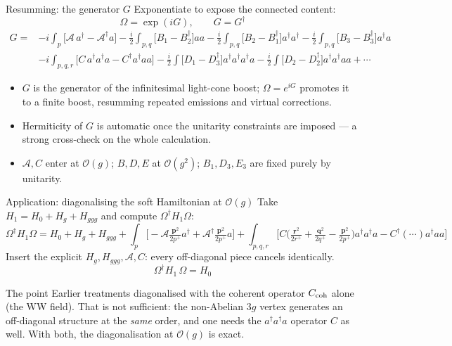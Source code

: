 \documentclass[9pt,aspectratio=169]{beamer}
\newcommand{\hl}[1]{\textcolor{acc}{#1}}
\newcommand{\hb}[1]{\textcolor{blu}{#1}}
\newcommand{\pp}{p^{+}}
\newcommand{\Om}{\Omega}
\newcommand{\Hg}{H_{g}}
\newcommand{\Hggg}{H_{ggg}}
\newcommand{\ad}{a^{\dagger}}
\begin{document}
\begin{frame}{Resumming: the generator $G$}
Exponentiate to expose the connected content:
\[
\boxed{\;\Om=\exp(iG),\qquad G=G^{\dagger}\;}
\]
\small
\begin{align*}
G=&-i\int_{p}\big[\mathcal{A}\,\ad-\mathcal{A}^{\dagger}a\big]
-\tfrac{i}{2}\!\int_{p,q}\big[B_{1}-B_{2}^{\dagger}\big]aa
-\tfrac{i}{2}\!\int_{p,q}\big[B_{2}-B_{1}^{\dagger}\big]\ad\ad
-\tfrac{i}{2}\!\int_{p,q}\big[B_{3}-B_{3}^{\dagger}\big]\ad a\\
&-i\!\int_{p,q,r}\big[C\,\ad\ad a-C^{\dagger}\ad a a\big]
-\tfrac{i}{2}\!\int\big[D_{1}-D_{3}^{\dagger}\big]\ad\ad\ad a
-\tfrac{i}{2}\!\int\big[D_{2}-D_{2}^{\dagger}\big]\ad\ad a a+\cdots
\end{align*}
\normalsize
\medskip
\begin{itemize}
  \item $G$ is the \hl{generator of the infinitesimal light-cone boost}; $\Om=e^{iG}$
        promotes it to a finite boost, resumming repeated emissions and virtual corrections.
  \item Hermiticity of $G$ is automatic once the unitarity constraints are imposed ---
        a strong \hb{cross-check} on the whole calculation.
  \item $\mathcal{A},C$ enter at $\mathcal{O}(g)$; $B,D,E$ at $\mathcal{O}(g^{2})$;
        $B_{1},D_{3},E_{3}$ are fixed purely by unitarity.
\end{itemize}
\end{frame}

\begin{frame}{Application: diagonalising the soft Hamiltonian at $\mathcal{O}(g)$}
Take $H_{1}=H_{0}+\Hg+\Hggg$ and compute $\Om^{\dagger}H_{1}\Om$:
\[
\Om^{\dagger}H_{1}\Om = H_{0}+\Hg+\Hggg
+\int_{p}\Big[-\mathcal{A}\tfrac{\bm p^{2}}{2\pp}\ad+\mathcal{A}^{\dagger}\tfrac{\bm p^{2}}{2\pp}a\Big]
+\int_{p,q,r}\Big[C\big(\tfrac{\bm r^2}{2r^+}+\tfrac{\bm q^2}{2q^+}-\tfrac{\bm p^2}{2\pp}\big)\ad\ad a
- C^{\dagger}(\cdots)\ad a a\Big]
\]
Insert the explicit $\Hg,\Hggg,\mathcal{A},C$: \hl{every off-diagonal piece cancels identically}.
\[
\boxed{\;\Om^{\dagger}H_{1}\,\Om=H_{0}\;}
\]
\medskip
\begin{alertblock}{The point}
Earlier treatments diagonalised with the \hb{coherent operator $C_{\rm coh}$ alone}
(the WW field). That is \hl{not sufficient}: the non-Abelian $3g$ vertex generates an
off-diagonal structure at the \emph{same} order, and one needs the $\ad\ad a$ operator
$C$ as well. With both, the diagonalisation at $\mathcal{O}(g)$ is \hl{exact}.
\end{alertblock}
\end{frame}
\end{document}

